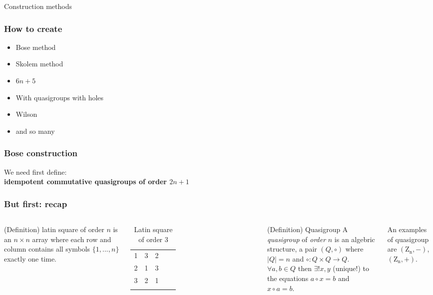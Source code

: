 \begin{frame}[plain,c]
\begin{center}
	\huge Construction methods
\end{center}
\end{frame}

\begin{frame}
	\frametitle{How to create}
	\begin{itemize}
		\item Bose method
		\item Skolem method
		\item $6n + 5$
		\item With quasigroups with holes
		\item Wilson
		\item and so many
	\end{itemize}
\end{frame}

\begin{frame}
	\frametitle{Bose construction}
	We need first define:\\
	\textbf{idempotent commutative quasigroups of order $2n + 1$}
\end{frame}

\begin{frame}
	\frametitle{But first: recap}
	\begin{columns}
		\begin{block}{(Definition) latin square of order $n$}
			is an $n \times n$ array where each row and column contains all symbols $\{1,...,n\}$ exactly one time.
		\end{block}
	\begin{table}[]
		\begin{tabular}{cccll}
			\cline{1-3}
			\multicolumn{1}{|c|}{1} & \multicolumn{1}{c|}{3} & \multicolumn{1}{c|}{2} &  &  \\ \cline{1-3}
			\multicolumn{1}{|c|}{2} & \multicolumn{1}{c|}{1} & \multicolumn{1}{c|}{3} &  &  \\ \cline{1-3}
			\multicolumn{1}{|c|}{3} & \multicolumn{1}{c|}{2} & \multicolumn{1}{c|}{1} &  &  \\ \cline{1-3}
			\multicolumn{1}{l}{}    & \multicolumn{1}{l}{}   & \multicolumn{1}{l}{}   &  & 
		\end{tabular}
	\caption{Latin square of order $3$}
	\end{table}
	
		\begin{block}{(Definition) Quasigroup}
		A \textit{quasigroup} of \textit{order} $n$ is an algebric structure, a pair $(Q,\circ)$ where $|Q|=n$ and $\circ : Q \times Q \rightarrow Q$.\\ $\forall a,b \in Q$ then $\exists! x,y$ (unique!) to the equations $a \circ x = b$ and $x \circ a = b$. 
		\end{block}

		An examples of quasigroup are $(\mathrm{Z_n},-)$,$(\mathrm{Z_n},+)$.
	\end{columns}
\end{frame}

